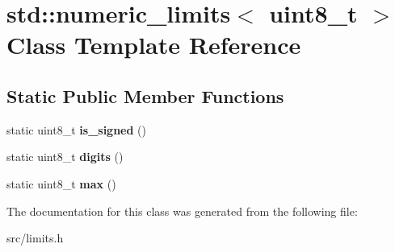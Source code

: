 \hypertarget{classstd_1_1numeric__limits_3_01uint8__t_01_4}{}\section{std\+:\+:numeric\+\_\+limits$<$ uint8\+\_\+t $>$ Class Template Reference}
\label{classstd_1_1numeric__limits_3_01uint8__t_01_4}
\subsection*{Static Public Member Functions}
\begin{DoxyCompactItemize}
\item 
static uint8\+\_\+t {\bfseries is\+\_\+signed} ()\hypertarget{classstd_1_1numeric__limits_3_01uint8__t_01_4_adcbd633b68edddbf4197919ab60bb9fd}{}\label{classstd_1_1numeric__limits_3_01uint8__t_01_4_adcbd633b68edddbf4197919ab60bb9fd}

\item 
static uint8\+\_\+t {\bfseries digits} ()\hypertarget{classstd_1_1numeric__limits_3_01uint8__t_01_4_a60652abaf60fe4ad2b9634e0281d9468}{}\label{classstd_1_1numeric__limits_3_01uint8__t_01_4_a60652abaf60fe4ad2b9634e0281d9468}

\item 
static uint8\+\_\+t {\bfseries max} ()\hypertarget{classstd_1_1numeric__limits_3_01uint8__t_01_4_a08e857684300f5f5d5e973e40af90a5d}{}\label{classstd_1_1numeric__limits_3_01uint8__t_01_4_a08e857684300f5f5d5e973e40af90a5d}

\end{DoxyCompactItemize}


The documentation for this class was generated from the following file\+:\begin{DoxyCompactItemize}
\item 
src/limits.\+h\end{DoxyCompactItemize}
